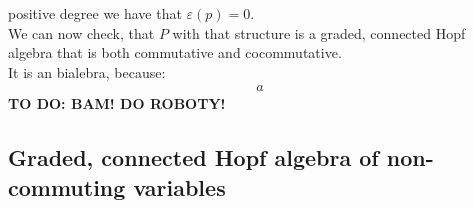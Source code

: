 \documentclass[a4paper, 12pt]{report}
\newcommand{\todo}[1]{\hfill \break \textbf{\Huge TO DO: #1 \hfill \break}\normalsize}
\begin{document}
positive degree we have that $\varepsilon(p) = 0$. \\
We can now check, that $P$ with that structure is a graded, connected Hopf algebra that is both commutative 
and cocommutative. \\
It is an bialebra, because: 
\begin{align*}
a
\end{align*}
\todo{BAM! DO ROBOTY!}
\subsection{Graded, connected Hopf algebra of non-commuting variables}
\end{document}
